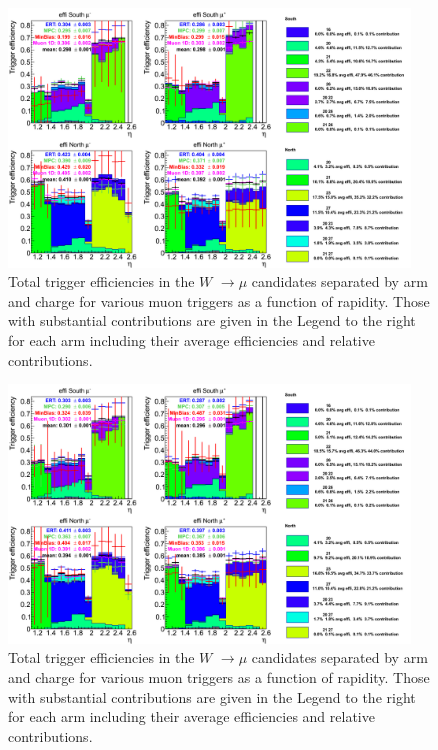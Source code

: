 \begin{figure}[ht]
\begin{center}
\includegraphics[width=0.95\textwidth]{./figures/totaltrigeffi13_all_wpt2.png}
\caption{\label{fig:totaltrigeffi_all_wpt2} Total trigger efficiencies in the $W$ $\rightarrow \mu$ candidates separated by arm and charge for various muon triggers as a function of rapidity. Those with substantial contributions are given in the Legend to the right for each arm including their average efficiencies and relative contributions.}
\end{center}
\end{figure}

\clearpage

\begin{figure}[ht]
\begin{center}
\includegraphics[width=0.95\textwidth]{./figures/totaltrigeffi13_all_wpt3.png}
\caption{\label{fig:totaltrigeffi_all_wpt3} Total trigger efficiencies in the $W$ $\rightarrow \mu$ candidates separated by arm and charge for various muon triggers as a function of rapidity. Those with substantial contributions are given in the Legend to the right for each arm including their average efficiencies and relative contributions.}
\end{center}
\end{figure}

